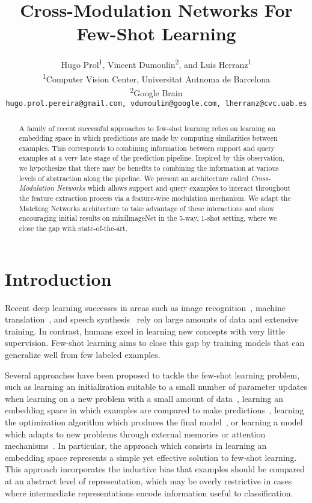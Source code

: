 \documentclass{article}
\title{Cross-Modulation Networks For Few-Shot Learning}
\author{
  Hugo Prol\textsuperscript{1}, Vincent Dumoulin\textsuperscript{2}, and
  Luis Herranz\textsuperscript{1} \\
  \textsuperscript{1}Computer Vision Center, Universitat Autnoma de Barcelona \\
  \textsuperscript{2}Google Brain \\
  \texttt{hugo.prol.pereira@gmail.com, vdumoulin@google.com, lherranz@cvc.uab.es}
}
\begin{document}
\maketitle

\begin{abstract}
  A family of recent successful approaches to few-shot learning relies
  on learning an embedding space in which predictions are made by
  computing similarities between examples. This corresponds to combining
  information between support and query examples at a very late
  stage of the prediction pipeline. Inspired by this observation, we
  hypothesize that there may be benefits to combining the information
  at various levels of abstraction along the pipeline. We present an
  architecture called \emph{Cross-Modulation Networks} which allows
  support and query examples to interact throughout the feature
  extraction process via a feature-wise modulation mechanism. We adapt the
  Matching Networks architecture to take advantage of these interactions
  and show encouraging initial results on miniImageNet in
  the 5-way, 1-shot setting, where we close the gap with state-of-the-art.
\end{abstract}

\section{Introduction}

Recent deep learning successes in areas such as image
recognition~\cite{simonyan14vgg,he2016resnet,hu17squeeze}, machine
translation~\cite{wu16googlemt,lample18phrase}, and speech
synthesis~\cite{oord2016wavenet} rely on large amounts of data and
extensive training. In contrast, humans excel in learning new concepts
with very little supervision. Few-shot learning aims to close this gap
by training models that can generalize well from few labeled examples.

Several approaches have been proposed to tackle the few-shot learning
problem, such as learning an initialization suitable to a small number
of parameter updates when learning on a new problem with a small
amount of
data~\cite{finn2017maml,nichol18reptile,kim2018bayesian,finn18platipus,grant18llama,rusu18leo},
learning an embedding space in which examples are compared to make
predictions~\cite{vinyals2016matching,snell2017proto,sung17relnet2,oreshkin18tadam},
learning the optimization algorithm which produces the final
model~\cite{ravi2017optim}, or learning a model which adapts to new
problems through external memories or attention
mechanisms~\cite{santoro2016meta,munkhdalai17condshift,shyam2017attentive,mishra2018simple}.
In particular, the approach which consists in learning an embedding
space represents a simple yet effective solution to few-shot learning.
This approach incorporates the inductive bias that examples should be
compared at an abstract level of representation, which may be overly
restrictive in cases where intermediate representations encode
information useful to classification.
\end{document}
